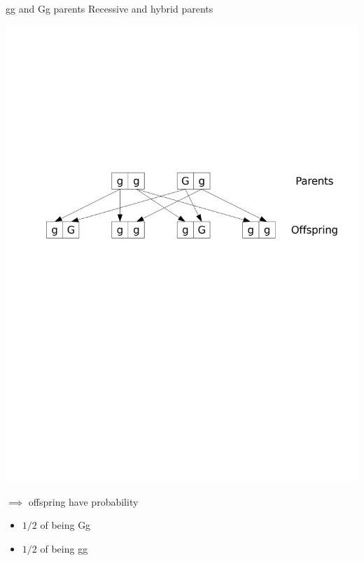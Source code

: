\documentclass[aspectratio=43]{beamer}
\begin{document}
\begin{frame}{gg and Gg parents}
Recessive and hybrid parents
\vfill
\begin{center}
	\includegraphics[width=\textwidth]{FIGS_slides/recessive_hybrid}
\end{center}
\vfill
$\implies$ offspring have probability 
\begin{itemize}
\item $1/2$ of being Gg 
\item $1/2$ of being gg
\end{itemize}
\end{frame}




\end{document}
